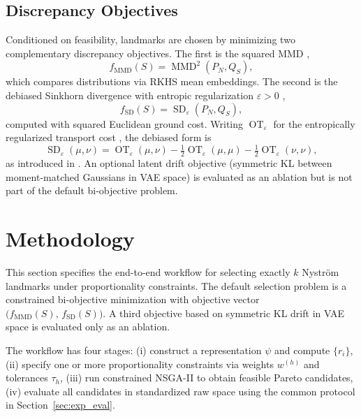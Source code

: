 \documentclass[10pt,journal]{IEEEtran}
\newcommand{\1}{\mathbf{1}}
\DeclareMathOperator{\MMD}{MMD}
\DeclareMathOperator{\OT}{OT}
\DeclareMathOperator{\SD}{SD}
\theoremstyle{ieeethm}
\begin{document}
\subsection{Discrepancy Objectives}
\label{subsec:objectives_prelim}

Conditioned on feasibility, landmarks are chosen by minimizing two complementary discrepancy
objectives. The first is the squared MMD \cite{gretton2012kernel,smola2007hilbert,sriperumbudur2010hilbert,muandet2017kernel},
\begin{equation}
\label{eq:mmd_def_prelim}
f_{\mathrm{MMD}}(S)
=
\MMD^2(P_N,Q_S),
\end{equation}
which compares distributions via RKHS mean embeddings. The second is the debiased Sinkhorn
divergence with entropic regularization $\varepsilon>0$
\cite{cuturi2013sinkhorn,feydy2019sinkhorn,peyre2019ot},
\begin{equation}
\label{eq:sd_def_prelim}
f_{\mathrm{SD}}(S)
=
\SD_{\varepsilon}(P_N,Q_S),
\end{equation}
computed with squared Euclidean ground cost. Writing $\OT_{\varepsilon}$ for the entropically
regularized transport cost \cite{villani2009ot}, the debiased form is
\[
\SD_{\varepsilon}(\mu,\nu)
=
\OT_{\varepsilon}(\mu,\nu)
-\tfrac12 \OT_{\varepsilon}(\mu,\mu)
-\tfrac12 \OT_{\varepsilon}(\nu,\nu),
\]
as introduced in \cite{feydy2019sinkhorn}. An optional latent drift objective (symmetric KL
between moment-matched Gaussians in VAE space) is evaluated as an ablation but is not part of the
default bi-objective problem.







\section{Methodology}
\label{sec:methodology}

This section specifies the end-to-end workflow for selecting exactly $k$ Nyström landmarks
under proportionality constraints.
The default selection problem is a constrained bi-objective minimization with objective vector $\big(f_{\mathrm{MMD}}(S),\, f_{\mathrm{SD}}(S)\big)$. A third objective based on symmetric KL drift in VAE space is evaluated only as an ablation.

The workflow has four stages:
(i) construct a representation $\psi$ and compute $\{r_i\}$,
(ii) specify one or more proportionality constraints via weights $w^{(h)}$ and tolerances $\tau_h$,
(iii) run constrained NSGA-II to obtain feasible Pareto candidates,
(iv) evaluate all candidates in standardized raw space using the common protocol in
Section~\ref{sec:exp_eval}.
\end{document}
